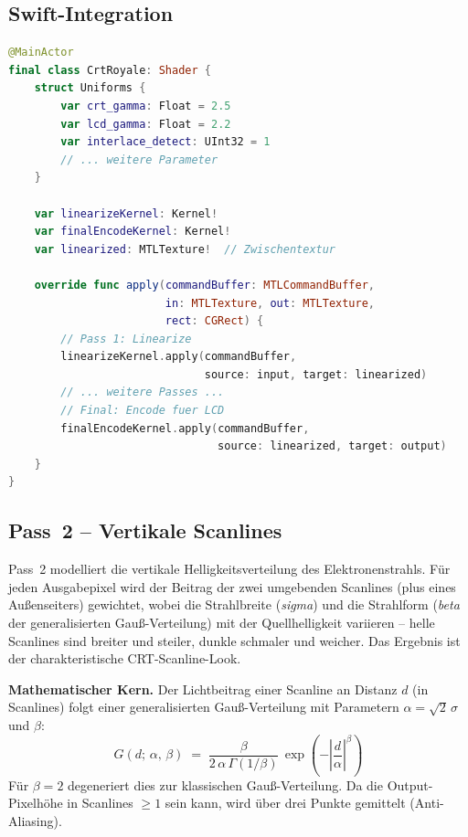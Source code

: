 \documentclass[11pt, a4paper]{article}
\begin{document}
\vspace{.5cm}
\subsection{Swift-Integration}
\vspace{.5cm}

\begin{lstlisting}[language=Swift, caption={CrtRoyale.swift -- Multi-Pass-Orchestrierung (vereinfacht)},
    morekeywords={class, final, override, func, var, let, struct, static, convenience, self, init}]
@MainActor
final class CrtRoyale: Shader {
    struct Uniforms {
        var crt_gamma: Float = 2.5
        var lcd_gamma: Float = 2.2
        var interlace_detect: UInt32 = 1
        // ... weitere Parameter
    }

    var linearizeKernel: Kernel!
    var finalEncodeKernel: Kernel!
    var linearized: MTLTexture!  // Zwischentextur

    override func apply(commandBuffer: MTLCommandBuffer,
                        in: MTLTexture, out: MTLTexture,
                        rect: CGRect) {
        // Pass 1: Linearize
        linearizeKernel.apply(commandBuffer,
                              source: input, target: linearized)
        // ... weitere Passes ...
        // Final: Encode fuer LCD
        finalEncodeKernel.apply(commandBuffer,
                                source: linearized, target: output)
    }
}
\end{lstlisting}

\newpage \vspace*{-.5cm}
\subsection{Pass~2 -- Vertikale Scanlines}
\vspace{.5cm}
Pass~2 modelliert die vertikale Helligkeitsverteilung des Elektronenstrahls. F\"ur jeden Ausgabepixel wird der Beitrag der zwei umgebenden Scanlines (plus eines Au\ss enseiters) gewichtet, wobei die Strahlbreite (\textit{sigma}) und die Strahlform (\textit{beta} der generalisierten Gau\ss-Verteilung) mit der Quellhelligkeit variieren -- helle Scanlines sind breiter und steiler, dunkle schmaler und weicher. Das Ergebnis ist der charakteristische CRT-Scanline-Look.

\vspace{.5cm}
\textbf{Mathematischer Kern.} Der Lichtbeitrag einer Scanline an Distanz $d$ (in Scanlines) folgt einer generalisierten Gau\ss-Verteilung mit Parametern $\alpha = \sqrt{2}\,\sigma$ und $\beta$:
\[
G(d;\,\alpha,\,\beta) \;=\; \frac{\beta}{2\,\alpha\,\Gamma(1/\beta)}\,\exp\!\left(-\left|\frac{d}{\alpha}\right|^{\beta}\right)
\]
F\"ur $\beta = 2$ degeneriert dies zur klassischen Gau\ss-Verteilung. Da die Output-Pixelh\"ohe in Scanlines $\geq 1$ sein kann, wird \"uber drei Punkte gemittelt (Anti-Aliasing).
\end{document}
